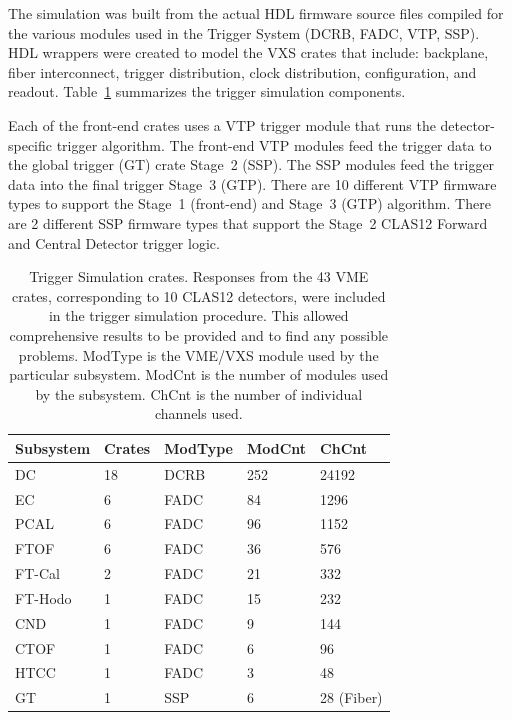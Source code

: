 The simulation was built from the actual HDL firmware source files compiled for the various modules used in
the Trigger System (DCRB, FADC, VTP, SSP). HDL wrappers were created to model the VXS crates that include:
backplane, fiber interconnect, trigger distribution, clock distribution, configuration, and readout.
Table~\ref{tab:trig_sim_crates} summarizes the trigger simulation components.

Each of the front-end crates uses a VTP trigger module that runs the detector-specific trigger algorithm.
The front-end VTP modules feed the trigger data to the global trigger (GT) crate Stage~2 (SSP). The SSP
modules feed the trigger data into the final trigger Stage~3 (GTP). There are 10 different VTP firmware
types to support the Stage~1 (front-end) and Stage~3 (GTP) algorithm. There are 2 different SSP firmware
types that support the Stage~2 CLAS12 Forward and Central Detector trigger logic.

\begin{table}
\begin{adjustbox}{width=\columnwidth,center}
	\begin{tabular}{| l | l | l | l | l |} \hline \hline
		Subsystem		& Crates	& ModType	& ModCnt	& ChCnt		\\ \hline
		DC			& 18		& DCRB		& 252		& 24192		\\
		EC  		        & 6			& FADC		& 84		& 1296	 	\\
		PCAL		& 6			& FADC		& 96		& 1152	 	\\
		FTOF		& 6			& FADC		& 36		& 576	 	\\
		FT-Cal		& 2			& FADC		& 21		& 332	 	\\
		FT-Hodo		& 1			& FADC		& 15		& 232	 	\\
		CND		& 1			& FADC		& 9			& 144	 	\\
		CTOF		& 1			& FADC		& 6			& 96	 	\\
		HTCC		& 1			& FADC		& 3			& 48	 	\\
		GT			& 1			& SSP		& 6			& 28 (Fiber)	\\
		\hline \hline
	\end{tabular}
\end{adjustbox}
\caption{Trigger Simulation crates. Responses from the 43 VME crates, corresponding to 10 CLAS12 detectors,
  were included in the trigger simulation procedure. This allowed comprehensive results to be provided and to
  find any possible problems. ModType is the VME/VXS module used by the particular subsystem. ModCnt is
  the number of modules used by the subsystem. ChCnt is the number of individual channels used.}
\label{tab:trig_sim_crates}
\end{table}

